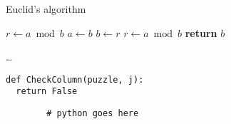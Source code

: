 \begin{algorithm}
  \caption{Euclid’s algorithm}
  \label{euclid}
  \begin{algorithmic}[1]
      \State $r\gets a\bmod b$
        \State $a\gets b$
        \State $b\gets r$
        \State $r\gets a\bmod b$
      \EndWhile
      \label{euclidendwhile}
      \State \textbf{return} $b$
    \EndFunction
  \end{algorithmic}
\end{algorithm}

\begin{algorithm}
  \begin{algorithmic}[0]
      \State \ldots\
    \EndFunction
  \end{algorithmic}
\end{algorithm}

\begin{listing}[h]
  \begin{verbatim}
def CheckColumn(puzzle, j):
  return False
  \end{verbatim}
\end{listing}

\begin{algorithm}
  \centering
  \begin{minipage}{0.50\textwidth}
  	\centering
  	\begin{algorithmic}[0]
  	\end{algorithmic}
  \end{minipage}\hfill
  \begin{minipage}{0.50\textwidth}
  	\centering
  	\begin{verbatim}
  		# python goes here
  	\end{verbatim}
  \end{minipage}
\end{algorithm}